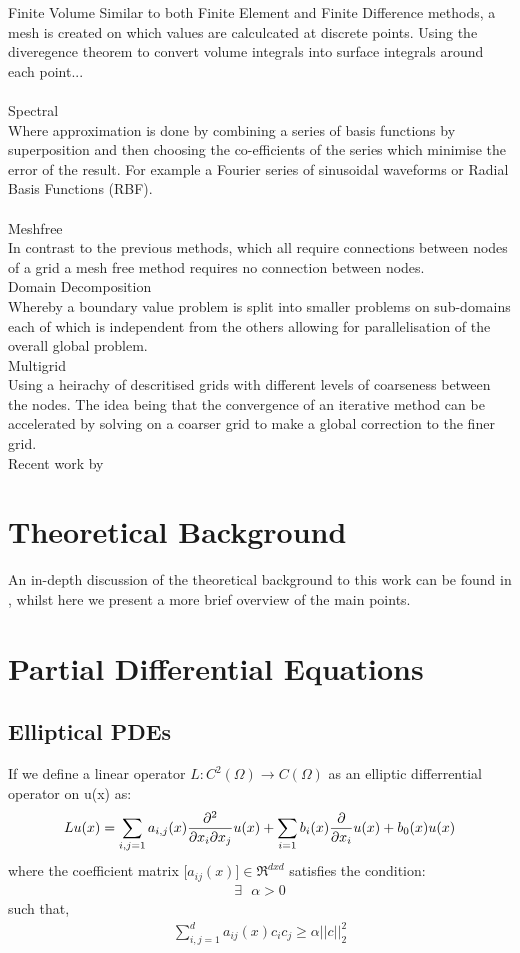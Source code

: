 \documentclass[a4paper]{amsart}
\begin{document}
\textperiodcentered Finite Volume
Similar to both Finite Element and Finite Difference methods, a mesh is created on which values are calculcated at discrete points. Using the diveregence theorem to convert volume integrals into surface integrals around each point...\\
\\ 
\textperiodcentered Spectral\\
Where approximation is done by combining a series of basis functions by superposition and then choosing the co-efficients of the series which minimise the error of the result. For example a Fourier series of sinusoidal waveforms or Radial Basis Functions (RBF).\\
\\ 
\textperiodcentered Meshfree\\
In contrast to the previous methods, which all require connections between nodes of a grid a mesh free method requires no connection between nodes.
\\ 
\textperiodcentered Domain Decomposition\\
Whereby a boundary value problem is split into smaller problems on sub-domains each of which is independent from the others allowing for parallelisation of the overall global problem.
\\ 
\textperiodcentered Multigrid\\
Using a heirachy of descritised grids with different levels of coarseness between the nodes. The idea being that the convergence of an iterative method can be accelerated by solving on a coarser grid to make a global correction to the finer grid.
\\
Recent work by

\section{Theoretical Background}
An in-depth discussion of the theoretical background to this work can be found in \cite{mski0}, whilst here we present a more brief overview of the main points.

\section{Partial Differential Equations}

\subsection{Elliptical PDEs}
If we define a linear operator $L : C^{2} (\Omega) \rightarrow C(\Omega)$ as an elliptic differrential operator on u(x) as:
\begin{equation}
Lu(x) = \sum_{i,j=1} a_{i,j}(x) \pdv{}{x_i}{x_j} u(x) + \sum_{i=1} b_{i}(x) \pdv{}{x_i} u(x) + b_{0}(x) u(x)
\label{EPDE}
\end{equation}
where the coefficient matrix $\big[ a_{ij}(x) \big] \in \Re^{dxd}$ satisfies the condition:
\begin{align*}
\exists \mbox{  } \alpha > 0
\end{align*}
 such that,
\begin{align*}
\sum_{i,j=1}^{d} a_{ij}(x)c_{i}c_{j}\geq \alpha||c||_{2}^{2}
\end{align*}
\end{document}
